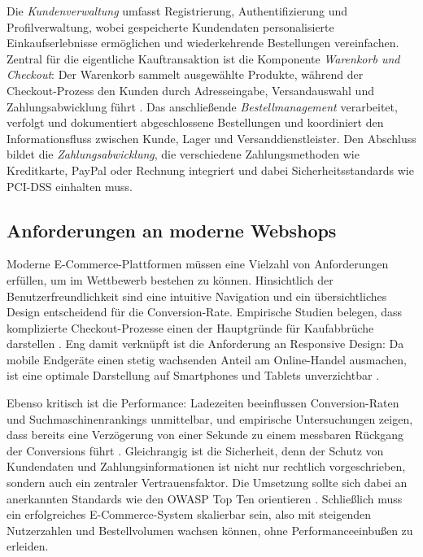 Die \textit{Kundenverwaltung} umfasst Registrierung, Authentifizierung und Profilverwaltung, wobei gespeicherte Kundendaten personalisierte Einkaufserlebnisse ermöglichen und wiederkehrende Bestellungen vereinfachen. Zentral für die eigentliche Kauftransaktion ist die Komponente \textit{Warenkorb und Checkout}: Der Warenkorb sammelt ausgewählte Produkte, während der Checkout-Prozess den Kunden durch Adresseingabe, Versandauswahl und Zahlungsabwicklung führt \cite{butnampetch2020}. Das anschließende \textit{Bestellmanagement} verarbeitet, verfolgt und dokumentiert abgeschlossene Bestellungen und koordiniert den Informationsfluss zwischen Kunde, Lager und Versanddienstleister. Den Abschluss bildet die \textit{Zahlungsabwicklung}, die verschiedene Zahlungsmethoden wie Kreditkarte, PayPal oder Rechnung integriert und dabei Sicherheitsstandards wie PCI-DSS einhalten muss.

\subsection{Anforderungen an moderne Webshops}
\label{subsec:webshop-anforderungen}

Moderne E-Commerce-Plattformen müssen eine Vielzahl von Anforderungen erfüllen, um im Wettbewerb bestehen zu können. Hinsichtlich der Benutzerfreundlichkeit sind eine intuitive Navigation und ein übersichtliches Design entscheidend für die Conversion-Rate. Empirische Studien belegen, dass komplizierte Checkout-Prozesse einen der Hauptgründe für Kaufabbrüche darstellen \cite{heinemann2024, butnampetch2020}. Eng damit verknüpft ist die Anforderung an Responsive Design: Da mobile Endgeräte einen stetig wachsenden Anteil am Online-Handel ausmachen, ist eine optimale Darstellung auf Smartphones und Tablets unverzichtbar \cite{nawir2024}.

Ebenso kritisch ist die Performance: Ladezeiten beeinflussen Conversion-Raten und Suchmaschinenrankings unmittelbar, und empirische Untersuchungen zeigen, dass bereits eine Verzögerung von einer Sekunde zu einem messbaren Rückgang der Conversions führt \cite{peterson2018}. Gleichrangig ist die Sicherheit, denn der Schutz von Kundendaten und Zahlungsinformationen ist nicht nur rechtlich vorgeschrieben, sondern auch ein zentraler Vertrauensfaktor. Die Umsetzung sollte sich dabei an anerkannten Standards wie den OWASP Top Ten orientieren \cite{fredj2020}. Schließlich muss ein erfolgreiches E-Commerce-System skalierbar sein, also mit steigenden Nutzerzahlen und Bestellvolumen wachsen können, ohne Performanceeinbußen zu erleiden.

